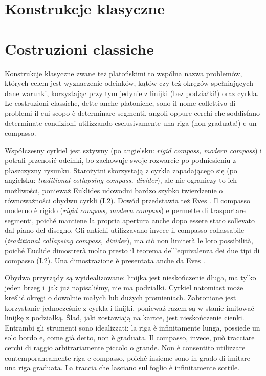 %

\chapter{Konstrukcje klasyczne} %
\chapter{Costruzioni classiche} %

Konstrukcje klasyczne zwane też platońskimi to wspólna nazwa problemów, których celem jest wyznaczenie odcinków, kątów czy też okręgów spełniających dane warunki, korzystając przy tym jedynie z linijki (bez podziałki!) oraz cyrkla. %
Le costruzioni classiche, dette anche platoniche, sono il nome collettivo di problemi il cui scopo è determinare segmenti, angoli oppure cerchi che soddisfano determinate condizioni utilizzando esclusivamente una riga (non graduata!) e un compasso. %

Współczesny cyrkiel jest sztywny (po angielsku: \emph{rigid compass, modern compass}) i potrafi przenosić odcinki, bo zachowuje swoje rozwarcie po podniesieniu z płaszczyzny rysunku. %
Starożytni skorzystają z cyrkla zapadającego się (po angielsku: \emph{traditional collapsing compass, divider}), ale nie ograniczy to ich możliwości, ponieważ Euklides udowodni bardzo szybko twierdzenie o równoważności obydwu cyrkli (I.2). %
Dowód przedstawia też Eves \cite[s. 155]{eves1_1972}. %
Il compasso moderno è rigido (\emph{rigid compass, modern compass}) e permette di trasportare segmenti, poiché mantiene la propria apertura anche dopo essere stato sollevato dal piano del disegno. %
Gli antichi utilizzavano invece il compasso collassabile (\emph{traditional collapsing compass, divider}), ma ciò non limiterà le loro possibilità, poiché Euclide dimostrerà molto presto il teorema dell'equivalenza dei due tipi di compasso (I.2). %
Una dimostrazione è presentata anche da Eves \cite[p. 155]{eves1_1972}. %

Obydwa przyrządy są wyidealizowane: linijka jest nieskończenie długa, ma tylko jeden brzeg i~jak już napisaliśmy, nie ma podziałki. %
Cyrkiel natomiast może kreślić okręgi o dowolnie małych lub dużych promieniach. %
Zabronione jest korzystanie jednocześnie z cyrkla i linijki, ponieważ razem są w stanie imitować linijkę z podziałką. %
Ślad, jaki zostawiają na kartce, jest nieskończenie cienki. %
Entrambi gli strumenti sono idealizzati: la riga è infinitamente lunga, possiede un solo bordo e, come già detto, non è graduata. %
Il compasso, invece, può tracciare cerchi di raggio arbitrariamente piccolo o grande. %
Non è consentito utilizzare contemporaneamente riga e compasso, poiché insieme sono in grado di imitare una riga graduata. %
La traccia che lasciano sul foglio è infinitamente sottile. %

